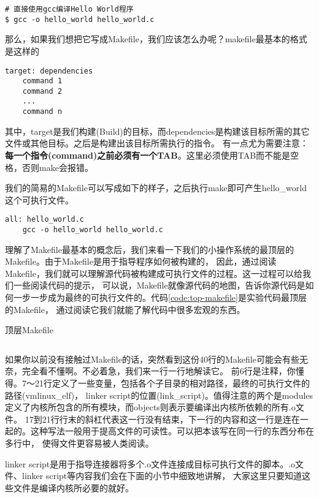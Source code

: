 \begin{verbatim}
# 直接使用gcc编译Hello World程序
$ gcc -o hello_world hello_world.c
\end{verbatim}

那么，如果我们想把它写成Makefile，我们应该怎么办呢？makefile最基本的格式是这样的

\begin{verbatim}
target: dependencies
    command 1
    command 2
    ...
    command n
\end{verbatim}

其中，target是我们构建(Build)的目标，而dependencies是构建该目标所需的其它文件或其他目标。之后是构建出该目标所需执行的指令。
有一点尤为需要注意：\textbf{每一个指令(command)之前必须有一个TAB}。这里必须使用TAB而不能是空格，否则make会报错。

我们的简易的Makefile可以写成如下的样子，之后执行make即可产生hello\_world这个可执行文件。

\begin{verbatim}
all: hello_world.c
    gcc -o hello_world hello_world.c
\end{verbatim}

理解了Makefile最基本的概念后，我们来看一下我们的小操作系统的最顶层的Makefile。由于Makefile是用于指导程序如何被构建的，
因此，通过阅读Makefile，我们就可以理解源代码被构建成可执行文件的过程。这一过程可以给我们一些阅读代码的提示，
可以说，Makefile就像源代码的地图，告诉你源代码是如何一步一步成为最终的可执行文件的。代码\ref{code:top-makefile}是实验代码最顶层的Makefile，
通过阅读它我们就能了解代码中很多宏观的东西。

\begin{codeBoxWithCaption}{顶层Makefile\label{code:top-makefile}}
  \inputminted[linenos]{make}{codes/top-Makefile}
\end{codeBoxWithCaption}

如果你以前没有接触过Makefile的话，突然看到这份40行的Makefile可能会有些无奈，完全看不懂啊。不必着急，我们来一行一行地解读它。
前6行是注释，你懂得。7～21行定义了一些变量，包括各个子目录的相对路径，最终的可执行文件的路径(vmlinux\_elf)，
linker script的位置(link\_script)。值得注意的两个是modules定义了内核所包含的所有模块，而objects则表示要编译出内核所依赖的所有.o文件。
17到21行行末的斜杠代表这一行没有结束，下一行的内容和这一行是连在一起的。这种写法一般用于提高文件的可读性。可以把本该写在同一行的东西分布在多行中，
使得文件更容易被人类阅读。

\begin{note}
linker script是用于指导连接器将多个.o文件连接成目标可执行文件的脚本。.o文件、linker script等内容我们会在下面的小节中细致地讲解，
大家这里只要知道这些文件是编译内核所必要的就好。
\end{note}

